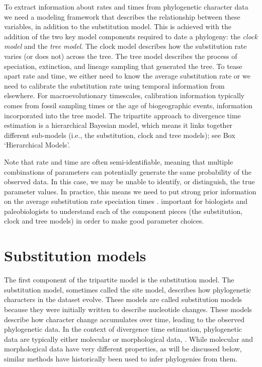 To extract information about rates and times from phylogenetic character data we need a modeling framework that describes the  relationship between these variables, in addition to the substitution model.
This is achieved with the addition of the two key model components required to date a phylogeny: the \textit{clock model} and the \textit{tree model}.
The clock model describes how the substitution rate varies (or does not) across the tree.
The tree model describes the process of speciation, extinction, and lineage sampling that generated the tree.
To tease apart rate and time, we either need to know the average substitution rate or we need to calibrate the substitution rate using temporal information from elsewhere.
For macroevolutionary timescales, calibration information typically comes from fossil sampling times or the age of biogeographic events, information incorporated into the tree model.
The tripartite approach to divergence time estimation is a hierarchical Bayesian model, which means it links together different sub-models (i.e., the substitution, clock and tree models); see Box `Hierarchical Models'.

Note that rate and time are often semi-identifiable, meaning that multiple combinations of parameters can potentially generate the same probability of the observed data.
In this case, we may be unable to identify, or distinguish, the true parameter values.
In practice, this means we need to put strong prior information on the average substitution rate  speciation times \citep{dosReis2013,dosReis2016}.
 important for biologists and paleobiologists to understand each of the component pieces (the substitution, clock and tree models) in order to make good parameter choices.

\section{Substitution models}

The first component of the tripartite model is the substitution model.
The substitution model, sometimes called the site model, describes how phylogenetic characters in the dataset evolve.
These models are called substitution models because they were initially written to describe nucleotide changes.
These models describe how character change accumulates over time, leading to the observed phylogenetic data.
In the context of divergence time estimation, phylogenetic data are typically either molecular or morphological data, .
While molecular and morphological data have very different properties, as will be discussed below, similar methods have historically been used to infer phylogenies from them.

